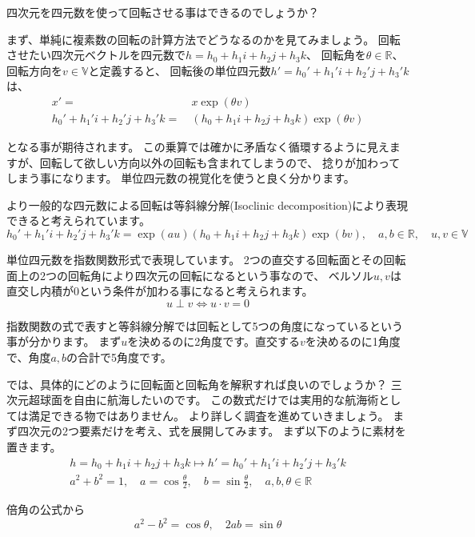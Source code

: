 \documentclass[a4paper,12pt,notitlepage]{jsreport}
\begin{document}
四次元を四元数を使って回転させる事はできるのでしょうか？

まず、単純に複素数の回転の計算方法でどうなるのかを見てみましょう。
回転させたい四次元ベクトルを四元数で$h=h_0+h_1i+h_2j+h_3k$、
回転角を$\theta\in\mathbb{R}$、回転方向を$v\in\mathbb{V}$と定義すると、
回転後の単位四元数$h'=h_0'+h_1'i+h_2'j+h_3'k$は、
\begin{equation}
\begin{split}
x'=~&x\exp(\theta v)\\
h_0'+h_1'i+h_2'j+h_3'k=~&(h_0+h_1i+h_2j+h_3k)\exp(\theta v)
\end{split}
\end{equation}

となる事が期待されます。
この乗算では確かに矛盾なく循環するように見えますが、回転して欲しい方向以外の回転も含まれてしまうので、
捻りが加わってしまう事になります。
単位四元数の視覚化を使うと良く分かります。

より一般的な四元数による回転は等斜線分解(Isoclinic decomposition)により表現できると考えられています。
\begin{equation}
h_0'+h_1'i+h_2'j+h_3'k=\exp(au)(h_0+h_1i+h_2j+h_3k)\exp(bv),\quad a,b\in\mathbb{R},\quad u,v\in\mathbb{V}
\end{equation}

単位四元数を指数関数形式で表現しています。
2つの直交する回転面とその回転面上の2つの回転角により四次元の回転になるという事なので、
ベルソル$u,v$は直交し内積が$0$という条件が加わる事になると考えられます。
\begin{equation}
u \perp v \iff u \cdot v=0
\end{equation}

指数関数の式で表すと等斜線分解では回転として5つの角度になっているという事が分かります。
まず$u$を決めるのに2角度です。直交する$v$を決めるのに1角度で、角度$a,b$の合計で5角度です。

では、具体的にどのように回転面と回転角を解釈すれば良いのでしょうか？
三次元超球面を自由に航海したいのです。
この数式だけでは実用的な航海術としては満足できる物ではありません。
より詳しく調査を進めていきましょう。
まず四次元の2つ要素だけを考え、式を展開してみます。
まず以下のように素材を置きます。
\begin{gather}
h=h_0+h_1i+h_2j+h_3k \mapsto h'=h_0'+h_1'i+h_2'j+h_3'k\\
a^2+b^2=1,\quad a=\cos\frac{\theta}{2},\quad b=\sin\frac{\theta}{2},
\quad a,b,\theta\in\mathbb{R}
\end{gather}

倍角の公式から
\begin{equation}
a^2-b^2=\cos\theta,\quad 2ab=\sin\theta
\end{equation}
\end{document}
